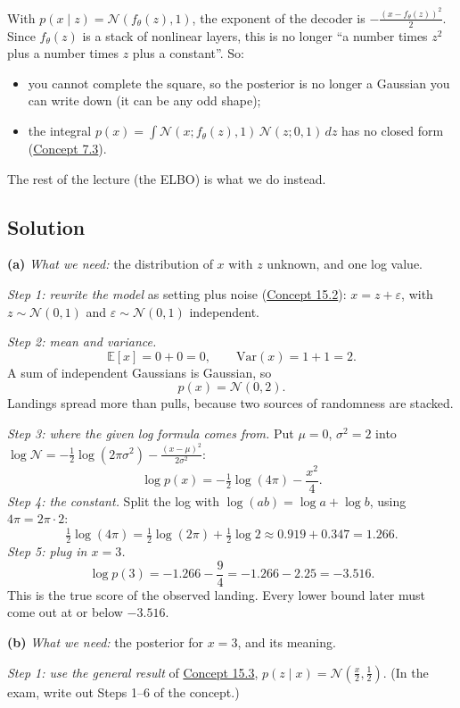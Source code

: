 \documentclass[12pt,a4paper]{article}
\begin{document}
With $p(x\mid z)=\mathcal{N}(f_\theta(z),1)$, the exponent of the decoder is $-\frac{(x-f_\theta(z))^2}{2}$. Since $f_\theta(z)$ is a stack of nonlinear layers, this is no longer ``a number times $z^2$ plus a number times $z$ plus a constant''. So:
\begin{itemize}[nosep]
  \item you cannot complete the square, so the posterior is no longer a Gaussian you can write down (it can be any odd shape);
  \item the integral $p(x)=\int\mathcal{N}(x;f_\theta(z),1)\,\mathcal{N}(z;0,1)\,dz$ has no closed form (\hyperref[c7-3]{Concept 7.3}).
\end{itemize}
The rest of the lecture (the ELBO) is what we do instead.

\subsection{Solution}

\textbf{(a)} \emph{What we need:} the distribution of $x$ with $z$ unknown, and one log value.

\emph{Step 1: rewrite the model} as setting plus noise (\hyperref[c15-2]{Concept 15.2}): $x=z+\varepsilon$, with $z\sim\mathcal{N}(0,1)$ and $\varepsilon\sim\mathcal{N}(0,1)$ independent.

\emph{Step 2: mean and variance.}
\[
\mathbb{E}[x]=0+0=0,\qquad \mathrm{Var}(x)=1+1=2 .
\]
A sum of independent Gaussians is Gaussian, so
\[
p(x)=\mathcal{N}(0,2).
\]
Landings spread more than pulls, because two sources of randomness are stacked.

\emph{Step 3: where the given log formula comes from.} Put $\mu=0$, $\sigma^2=2$ into $\log\mathcal{N}=-\frac12\log(2\pi\sigma^2)-\frac{(x-\mu)^2}{2\sigma^2}$:
\[
\log p(x)=-\tfrac12\log(4\pi)-\frac{x^2}{4}.
\]
\emph{Step 4: the constant.} Split the log with $\log(ab)=\log a+\log b$, using $4\pi=2\pi\cdot2$:
\[
\tfrac12\log(4\pi)=\tfrac12\log(2\pi)+\tfrac12\log2\approx0.919+0.347=1.266 .
\]
\emph{Step 5: plug in $x=3$.}
\[
\log p(3)=-1.266-\frac{9}{4}=-1.266-2.25=-3.516 .
\]
This is the true score of the observed landing. Every lower bound later must come out at or below $-3.516$.

\textbf{(b)} \emph{What we need:} the posterior for $x=3$, and its meaning.

\emph{Step 1: use the general result} of \hyperref[c15-3]{Concept 15.3}, $p(z\mid x)=\mathcal{N}(\frac x2,\frac12)$. (In the exam, write out Steps 1--6 of the concept.)
\end{document}
